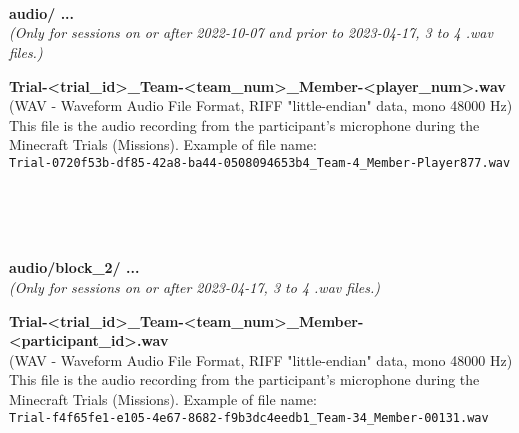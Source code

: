 \begin{description}
\textbf{\\\\\\}
\begin{addmargin}[0em]{0em} %
    \label{Trial-<trial_id>_Team-<team_num>_Member-<player_num>.wav}
    \textbf{audio/ ... }\\
    \textit{(Only for sessions on or after 2022-10-07 and prior to 2023-04-17, 3 to 4 .wav files.)}\\ 
    \begin{addmargin}[1em]{0em} %
        \textbf{Trial-<trial\_id>\_Team-<team\_num>\_Member-<player\_num>.wav}\\
        (WAV - Waveform Audio File Format, RIFF "little-endian" data, mono 48000 Hz)\\
        This file is the audio recording from the participant's microphone during the Minecraft Trials (Missions).
        Example of file name:\\
        \verb|Trial-0720f53b-df85-42a8-ba44-0508094653b4_Team-4_Member-Player877.wav|
    \end{addmargin} %
\end{addmargin} %

\textbf{\\\\\\}
\begin{addmargin}[0em]{0em} %
    \label{Trial-<trial_id>_Team-<team_num>_Member-<participant_id>.wav}
    \textbf{audio/block\_2/ ... }\\
    \textit{(Only for sessions on or after 2023-04-17, 3 to 4 .wav files.)}\\ 
    \begin{addmargin}[1em]{0em} %
        \textbf{Trial-<trial\_id>\_Team-<team\_num>\_Member-<participant\_id>.wav}\\
        (WAV - Waveform Audio File Format, RIFF "little-endian" data, mono 48000 Hz)\\
        This file is the audio recording from the participant's microphone during the Minecraft Trials (Missions).
        Example of file name:\\
        \verb|Trial-f4f65fe1-e105-4e67-8682-f9b3dc4eedb1_Team-34_Member-00131.wav|
    \end{addmargin} %
\end{addmargin} %


\end{description}
